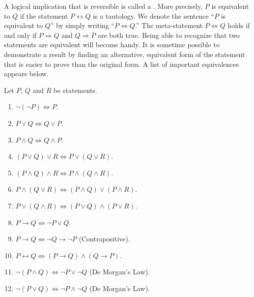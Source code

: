 A logical implication that is reversible is called a .
More precisely, $P$ is equivalent to $Q$ if the statement $P \leftrightarrow Q$ is a tautology.
We denote the sentence ``$P$ is equivalent to $Q$'' by simply writing ``$P \Leftrightarrow Q$.''
The meta-statement $P \Leftrightarrow Q$ holds if and only if $P \Rightarrow Q$ and $Q \Rightarrow P$ are both true.
Being able to recognize that two statements are equivalent will become handy.
It is sometime possible to demonstrate a result by finding an alternative, equivalent form of the statement that is easier to prove than the original form.
A list of important equivalences appears below.

\begin{fact}
Let $P$, $Q$ and $R$ be statements.
\begin{enumerate}
\item $\neg (\neg P) \Leftrightarrow P$.
\item $P \vee Q \Leftrightarrow Q \vee P$.
\item $P \wedge Q \Leftrightarrow Q \wedge P$.
\item $(P \vee Q) \vee R \Leftrightarrow P \vee (Q \vee R)$.
\item $(P \wedge Q) \wedge R \Leftrightarrow P \wedge (Q \wedge R)$.
\item $P \wedge (Q \vee R) \Leftrightarrow (P \wedge Q) \vee (P \wedge R)$.
\item $P \vee (Q \wedge R) \Leftrightarrow (P \vee Q) \wedge (P \vee R)$.
\item $P \rightarrow Q \Leftrightarrow \neg P \vee Q$.
\item $P \rightarrow Q \Leftrightarrow \neg Q \rightarrow \neg P$ (Contrapositive).
\item $P \leftrightarrow Q \Leftrightarrow (P \rightarrow Q) \wedge (Q \rightarrow P)$.
\item $\neg (P \wedge Q) \Leftrightarrow \neg P \vee \neg Q$ (De Morgan's Law).
\item $\neg (P \vee Q) \Leftrightarrow \neg P \wedge \neg Q$ (De Morgan's Law).
\end{enumerate}
\end{fact}


